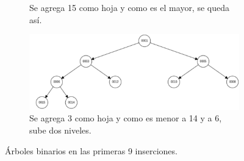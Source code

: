 \documentclass[12pt]{article}
\begin{document}
\begin{figure}
\begin{subfigure}{.6\textwidth}
	\caption{Se agrega 15 como hoja y como es el mayor, se queda así.}
	\label{fig:sfig8}
\end{subfigure}
\begin{subfigure}{.6\textwidth}
	\centering
	\includegraphics[width=1.04\linewidth]{hp009}
	\caption{Se agrega 3 como hoja y como es menor a 14 y a 6, sube dos niveles.}
	\label{fig:sfig9}
\end{subfigure}
	\caption{Árboles binarios en las primeras 9 inserciones.}
	\label{fig:fig}
\end{figure}
\end{document}
